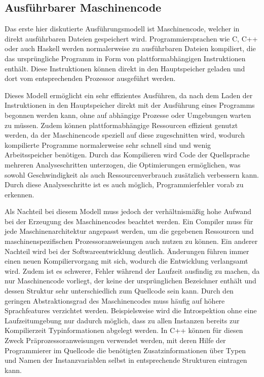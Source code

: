 \documentclass[11pt, parskip=half]{scrartcl}       %
\begin{document}
\subsection{Ausführbarer Maschinencode}

Das erste hier diskutierte Ausführungsmodell ist Maschinencode, welcher in direkt ausführbaren Dateien gespeichert wird.
Programmiersprachen wie C, C++ oder auch Haskell werden normalerweise zu ausführbaren Dateien kompiliert, die das ursprüngliche Programm in Form von plattformabhängigen Instruktionen enthält.
Diese Instruktionen können direkt in den Hauptspeicher geladen und dort vom entsprechenden Prozessor ausgeführt werden.

Dieses Modell ermöglicht ein sehr effizientes Ausführen, da nach dem Laden der Instruktionen in den Hauptspeicher direkt mit der Ausführung eines Programms begonnen werden kann, ohne auf abhängige Prozesse oder Umgebungen warten zu müssen.
Zudem können plattformabhängige Ressourcen effizient genutzt werden, da der Maschinencode speziell auf diese zugeschnitten wird, wodurch kompilierte Programme normalerweise sehr schnell sind und wenig Arbeitsspeicher benötigen.
Durch das Kompilieren wird Code der Quellsprache mehreren Analyseschritten\cite{advanced_compiler_design} unterzogen, die Optimierungen ermöglichen, was sowohl Geschwindigkeit als auch Ressourcenverbrauch zusätzlich verbessern kann.
Durch diese Analyseschritte ist es auch möglich, Programmierfehler vorab zu erkennen.

Als Nachteil bei diesem Modell muss jedoch der verhältnismäßig hohe Aufwand bei der Erzeugung des Maschinencodes beachtet werden.
Ein Compiler muss für jede Maschinenarchitektur angepasst werden, um die gegebenen Ressourcen und maschinenspezifischen Prozessoranweisungen auch nutzen zu können.
Ein anderer Nachteil wird bei der Softwareentwicklung deutlich.
Änderungen führen immer einen neuen Kompiliervorgang mit sich, wodurch die Entwicklung verlangsamt wird.
Zudem ist es schwerer, Fehler während der Laufzeit ausfindig zu machen, da nur Maschinencode vorliegt, der keine der ursprünglichen Bezeichner enthält und dessen Struktur sehr unterschiedlich zum Quellcode sein kann.
Durch den geringen Abstraktionsgrad des Maschinencodes muss häufig auf höhere Sprachfeatures verzichtet werden.\cite{quora_pros_and_cons_compiled_languages}
Beispielsweise wird die Introspektion ohne eine Laufzeitumgebung nur dadurch möglich, dass zu allen Instanzen bereits zur Kompilierzeit Typinformationen abgelegt werden.\cite{reflexive_programmiersprachen}
In C++ können für diesen Zweck Präprozessoranweisungen verwendet werden, mit deren Hilfe der Programmierer im Quellcode die benötigten Zusatzinformationen über Typen und Namen der Instanzvariablen selbst in entsprechende Strukturen eintragen kann.
\end{document}
